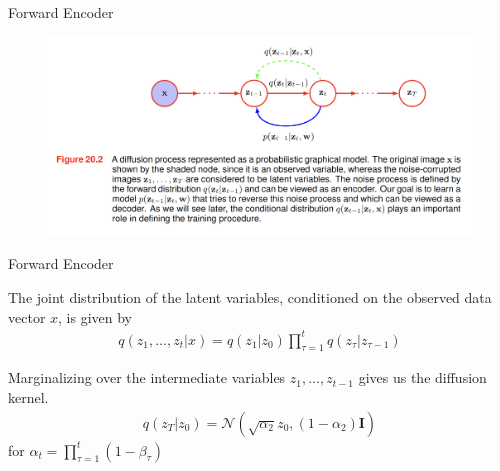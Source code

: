 \documentclass[aspectratio=169,xcolor=dvipsnames]{beamer}
\theoremstyle{named}
\begin{document}

\begin{frame}{Forward Encoder}

\begin{figure}[h!]
\centering
\includegraphics[width=130mm]{forward-markov.png}
\end{figure}
\end{frame}


\begin{frame}{Forward Encoder}

The joint distribution of the latent variables, conditioned on the observed data vector $x$, is given by
\begin{align*}
    q(z_1, \dots, z_t | x) = q(z_1 | z_0) \prod^{t}_{\tau=1} q(z_\tau | z_{\tau - 1})
\end{align*}

Marginalizing over the intermediate variables $z_1, \dots, z_{t-1}$ gives us the \alert{diffusion kernel}.
\begin{align*}
     q(z_T | z_0) = \mathcal{N}(\sqrt{\alpha_2} z_0, (1 - \alpha_2) \mathbf{I})
\end{align*}
for $\alpha_t = \prod^{t}_{\tau=1}(1-\beta_\tau)$

\end{frame}

\end{document}
